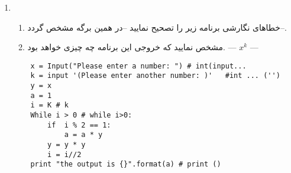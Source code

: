 \documentclass[a4paper,12pt,flowchart,key]{unistyle}
\begin{document}
\begin{enumerate}
   \item
   \begin{enumerate}
       \item خطاهای نگارشی برنامه زیر را تصحیح نمایید --در همین برگه مشخص گردد--. 
       \item مشخص نمایید که خروجی این برنامه چه چیزی خواهد بود.  ---  $x^k$  --- 
   \end{enumerate}

    \begin{latin}
    \begin{lstlisting}
    x = Input("Please enter a number: ") # int(input...
    k = input '(Please enter another number: )'   #int ... ('')
    y = x
    a = 1
    i = K # k
    While i > 0 # while i>0:
        if  i % 2 == 1:
            a = a * y
        y = y * y
        i = i//2
    print "the output is {}".format(a) # print ()
    \end{lstlisting}
    \end{latin}

\end{enumerate}
\sign
\null\vfill

\null\vfill\kalamehakim[1]\xepersianproof
\end{document}
